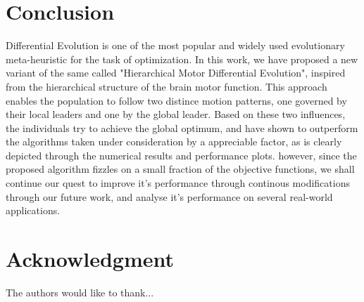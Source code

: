 \documentclass[conference]{IEEEtran}
\begin{document}
\section{Conclusion}
%
Differential Evolution is one of the most popular and widely used evolutionary meta-heuristic for the task of optimization. In this work,  we have proposed a new variant of the same called "Hierarchical Motor Differential Evolution", inspired from the hierarchical structure of the brain motor function. This approach enables the population to follow two distince motion patterns, one governed by their local leaders and one by the global leader. Based on these two influences, the individuals try to achieve the global optimum, and have shown to outperform the algorithms taken under consideration by a appreciable factor, as is clearly depicted through the numerical results and performance plots. however, since the proposed algorithm fizzles on a small fraction of the objective functions, we shall continue our quest to improve it's performance through continous modifications through our future work, and analyse it's performance on several real-world applications.





\section*{Acknowledgment}


The authors would like to thank...







%
%
%




\end{document}
